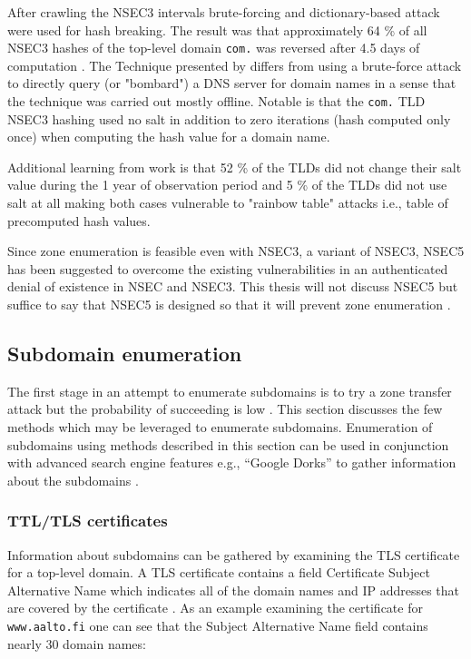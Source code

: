 After crawling the NSEC3 intervals brute-forcing and dictionary-based attack were used for hash breaking. The result was that approximately 64 \% of all NSEC3 hashes of the top-level domain \texttt{com.} was reversed after 4.5 days of computation \cite{NSEC3_hash_breaking}. The Technique presented by \citet{NSEC3_hash_breaking} differs from using a brute-force attack to directly query (or "bombard") a DNS server for domain names in a sense that the technique was carried out mostly offline. Notable is that the \texttt{com.} TLD NSEC3 hashing used no salt in addition to zero iterations (hash computed only once) when computing the hash value for a domain name.


Additional learning from \citet{NSEC3_hash_breaking} work is that 52 \% of the TLDs did not change their salt value during the 1 year of observation period and 5 \% of the TLDs did not use salt at all making both cases vulnerable to "rainbow table" attacks i.e., table of precomputed hash values.

Since zone enumeration is feasible even with NSEC3, a variant of NSEC3, NSEC5 \cite{NSEC5} has been suggested to overcome the existing vulnerabilities in an authenticated denial of existence in NSEC and NSEC3. This thesis will not discuss NSEC5 but suffice to say that NSEC5 is designed so that it will prevent zone enumeration \cite{NSEC5_provably}.



\subsection{Subdomain enumeration}

The first stage in an attempt to enumerate subdomains is to try a zone transfer attack but the probability of succeeding is low \cite{NSEC3_hash_breaking}. This section discusses the few methods which may be leveraged to enumerate subdomains. Enumeration of subdomains using methods described in this section can be used in conjunction with advanced search engine features e.g., “Google Dorks” to gather information about the subdomains \cite{hacking_exposed}.


\subsubsection{TTL/TLS certificates}

Information about subdomains can be gathered by examining the TLS certificate for a top-level domain. A TLS certificate contains a field Certificate Subject Alternative Name which indicates all of the domain names and IP addresses that are covered by the certificate \citep{hacking_exposed}. As an example examining the certificate for \texttt{www.aalto.fi} one can see that the Subject Alternative Name field contains nearly 30 domain names:

